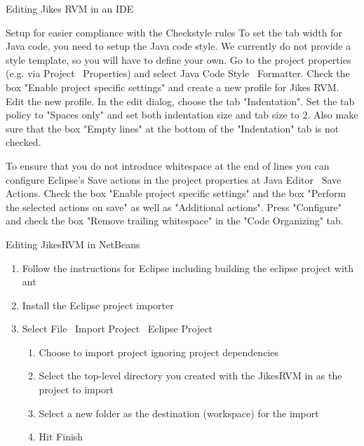 \begin{section}{Editing Jikes RVM in an IDE}
\begin{subsection}{Setup for easier compliance with the Checkstyle rules}
To set the tab width for Java code, you need to setup the Java code style. We currently do not provide a style template, so you will have to define your own. Go to the project properties (e.g. via Project \textrightarrow\ Properties) and select Java Code Style \textrightarrow\ Formatter. Check the box "Enable project specific settings" and create a new profile for Jikes RVM. Edit the new profile. In the edit dialog, choose the tab "Indentation". Set the tab policy to "Spaces only" and set both indentation size and tab size to 2. Also make sure that the box "Empty lines" at the bottom of the "Indentation" tab is not checked.

To ensure that you do not introduce whitespace at the end of lines you can configure Eclipse's Save actions in the project properties at Java Editor \textrightarrow\ Save Actions. Check the box "Enable project specific settings" and the box "Perform the selected actions on save" as well as "Additional actions". Press "Configure" and check the box "Remove trailing whitespace" in the "Code Organizing" tab.

\end{subsection}

\begin{subsection}{Editing JikesRVM in NetBeans}

\begin{enumerate}
  \item Follow the instructions for Eclipse including building the eclipse project with ant
  \item Install the Eclipse project importer
  \item Select File \textrightarrow\ Import Project \textrightarrow\ Eclipse Project
    \begin{enumerate} 
      \item Choose to import project ignoring project dependencies
      \item Select the top-level directory you created with the JikesRVM in as the project to import
      \item Select a new folder as the destination (workspace) for the import
      \item Hit Finish
    \end{enumerate}
\end{enumerate}

\end{subsection}

\end{section}
